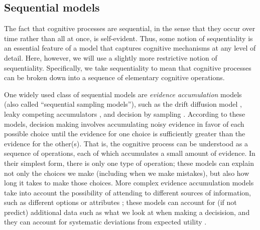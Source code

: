 
\subsection{Sequential models}

The fact that cognitive processes are sequential, in the sense that they occur over time rather than all at once, is self-evident. Thus, some notion of sequentiality is an essential feature of a model that captures cognitive mechanisms at any level of detail. Here, however, we will use a slightly more restrictive notion of sequentiality. Specifically, we take sequentiality to mean that cognitive processes can be broken down into a sequence of elementary cognitive operations.

One widely used class of sequential models are \emph{evidence accumulation} models (also called ``sequential sampling models''), such as the drift diffusion model \citep{ratcliff1978theory}, leaky competing accumulators \citep{usher2001time}, and decision by sampling \citep{stewart2006decision}. According to these models, decision making involves accumulating noisy evidence in favor of each possible choice until the evidence for one choice is sufficiently greater than the evidence for the other(s). That is, the cognitive process can be understood as a sequence of operations, each of which accumulates a small amount of evidence. In their simplest form, there is only one type of operation; these models can explain not only the choices we make (including when we make mistakes), but also how long it takes to make those choices. More complex evidence accumulation models take into account the possibility of attending to different sources of information, such as different options \citep{krajbich2010visual} or attributes \citep{russo1983strategies}; these models can account for (if not predict) additional data such as what we look at when making a decisision, and they can account for systematic deviations from expected utility \citep{busemeyer2019cognitive}.


